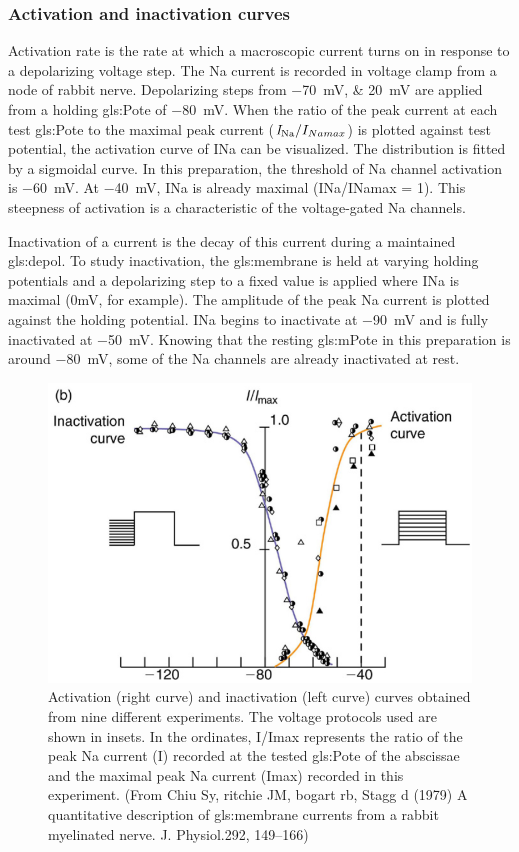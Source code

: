 \documentclass[class={myRUCProject}, crop=false]{standalone}
\begin{document}
\subsubsection{Activation and inactivation curves }
Activation rate is the rate at which a macroscopic current turns on in response to a depolarizing voltage step. The \gls{Na} current is recorded in voltage clamp from a node of rabbit nerve. Depolarizing steps from \qtylist{-70;20}{\mV} are applied from a holding \gls{gls:Pote} of \qty{-80}{\mV}. When the ratio of the peak current at each test \gls{gls:Pote} to the maximal peak current (\(\unit{\cur\sodium}/I_{Namax}\)) is plotted against test potential, the activation curve of INa can be visualized. The distribution is fitted by a sigmoidal curve. In this preparation, the threshold of \gls{Na} channel activation is \qty{-60}{\mV}. At \qty{-40}{\mV}, INa is already maximal (INa/INamax = 1). This steepness of activation is a characteristic of the voltage-gated \gls{Na} channels. 

Inactivation of a current is the decay of this current during a maintained \gls{gls:depol}. To study inactivation, the \gls{gls:membrane} is held at varying holding potentials and a depolarizing step to a fixed value is applied where INa is maximal (0mV, for example). The amplitude of the peak \gls{Na} current is plotted against the holding potential. INa begins to inactivate at \qty{-90}{\mV} and is fully inactivated at \qty{-50}{\mV}. Knowing that the resting \gls{gls:mPote} in this preparation is around \qty{-80}{\mV}, some of the \gls{Na} channels are already inactivated at rest. 
\begin{figure}[H]
    \centering
    \includegraphics[width=0.5\linewidth]{Pictures//Anakin/activ-inactiv.png}
    \caption{Activation (right curve) and inactivation (left curve) curves obtained from nine different experiments. The voltage protocols used are shown in insets. In the ordinates, I/Imax represents the ratio of the peak \gls{Na} current (I) recorded at the tested \gls{gls:Pote} of the abscissae and the maximal peak \gls{Na} current (Imax) recorded in this experiment. (From Chiu Sy, ritchie JM, bogart rb, Stagg d (1979) A quantitative description of \gls{gls:membrane} currents from a rabbit myelinated nerve. J. Physiol.292, 149–166) }
    \label{fig:enter-label}
\end{figure}
\end{document}
